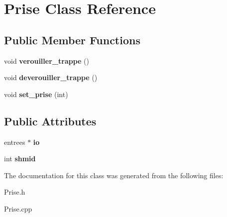 \hypertarget{classPrise}{}\section{Prise Class Reference}
\label{classPrise}
\subsection*{Public Member Functions}
\begin{DoxyCompactItemize}
\item 
\mbox{\label{classPrise_a3c23e0e69c65fae933baece16637212f}} 
void {\bfseries verouiller\+\_\+trappe} ()
\item 
\mbox{\label{classPrise_a51fefe00c1fe000bb3f432b288d3f38c}} 
void {\bfseries deverouiller\+\_\+trappe} ()
\item 
\mbox{\label{classPrise_a578a4fe33f5cdb817b9f5b571ea8435c}} 
void {\bfseries set\+\_\+prise} (int)
\end{DoxyCompactItemize}
\subsection*{Public Attributes}
\begin{DoxyCompactItemize}
\item 
\mbox{\label{classPrise_a38a10200a9c39acd3c143d5b81759ed5}} 
entrees $\ast$ {\bfseries io}
\item 
\mbox{\label{classPrise_a64e09ae75aad37d4065b08c7f1b196d8}} 
int {\bfseries shmid}
\end{DoxyCompactItemize}


The documentation for this class was generated from the following files\+:\begin{DoxyCompactItemize}
\item 
Prise.\+h\item 
Prise.\+cpp\end{DoxyCompactItemize}
